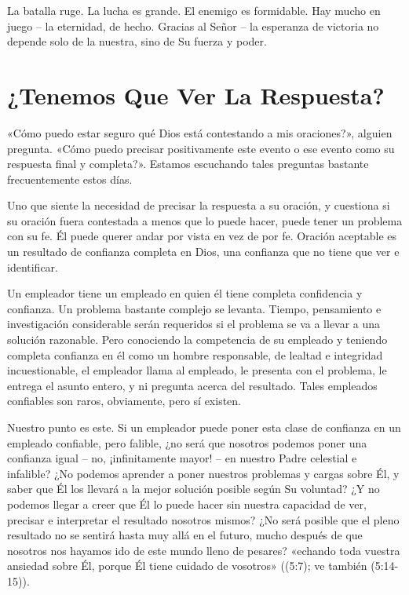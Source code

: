 \documentclass[12pt, twoside, openright]{book}
\begin{document}
La batalla ruge. La lucha es grande. El enemigo es formidable. Hay mucho en juego – la eternidad, de hecho. Gracias al Señor – la esperanza de victoria no depende solo de la nuestra, sino de Su fuerza y poder. 

\section{¿Tenemos Que Ver La Respuesta?}
«Cómo puedo estar seguro qué Dios está contestando a mis oraciones?», alguien pregunta. «Cómo puedo precisar positivamente este evento o ese evento como su respuesta final y completa?». Estamos escuchando tales preguntas bastante frecuentemente estos días.

Uno que siente la necesidad de precisar la respuesta a su oración, y cuestiona si su oración fuera contestada a menos que lo puede hacer, puede tener un problema con su fe. Él puede querer andar por vista en vez de por fe. Oración aceptable es un resultado de confianza completa en Dios, una confianza que no tiene que ver e identificar.

Un empleador tiene un empleado en quien él tiene completa confidencia y confianza. Un problema bastante complejo se levanta. Tiempo, pensamiento e investigación considerable serán requeridos si el problema se va a llevar a una solución razonable. Pero conociendo la competencia de su empleado y teniendo completa confianza en él como un hombre responsable, de lealtad e integridad incuestionable, el empleador llama al empleado, le presenta con el problema, le entrega el asunto entero, y ni pregunta acerca del resultado. Tales empleados confiables son raros, obviamente, pero sí existen. 

Nuestro punto es este. Si un empleador puede poner esta clase de confianza en un empleado confiable, pero falible, ¿no será que nosotros podemos poner una confianza igual – no, ¡infinitamente mayor! – en nuestro Padre celestial e infalible? ¿No podemos aprender a poner nuestros problemas y cargas sobre Él, y saber que Él los llevará a la mejor solución posible según Su voluntad? ¿Y no podemos llegar a creer que Él lo puede hacer sin nuestra capacidad de ver, precisar e interpretar el resultado nosotros mismos? ¿No será posible que el pleno resultado no se sentirá hasta muy allá en el futuro, mucho después de que nosotros nos hayamos ido de este mundo lleno de pesares? «echando toda vuestra ansiedad sobre Él, porque Él tiene cuidado de vosotros» ((5:7); ve también (5:14-15)).
\end{document}
